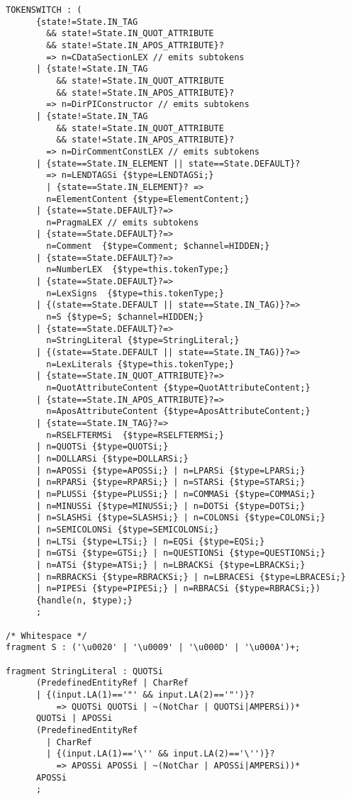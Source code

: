 \begin{verbatim}
TOKENSWITCH : (
      {state!=State.IN_TAG 
        && state!=State.IN_QUOT_ATTRIBUTE 
        && state!=State.IN_APOS_ATTRIBUTE}?
        => n=CDataSectionLEX // emits subtokens
      | {state!=State.IN_TAG 
          && state!=State.IN_QUOT_ATTRIBUTE
          && state!=State.IN_APOS_ATTRIBUTE}?
        => n=DirPIConstructor // emits subtokens
      | {state!=State.IN_TAG 
          && state!=State.IN_QUOT_ATTRIBUTE 
          && state!=State.IN_APOS_ATTRIBUTE}?
        => n=DirCommentConstLEX // emits subtokens
      | {state==State.IN_ELEMENT || state==State.DEFAULT}?
        => n=LENDTAGSi {$type=LENDTAGSi;}
        | {state==State.IN_ELEMENT}? =>
        n=ElementContent {$type=ElementContent;} 
      | {state==State.DEFAULT}?=>
        n=PragmaLEX // emits subtokens
      | {state==State.DEFAULT}?=>
        n=Comment  {$type=Comment; $channel=HIDDEN;}
      | {state==State.DEFAULT}?=> 
        n=NumberLEX  {$type=this.tokenType;}
      | {state==State.DEFAULT}?=>
        n=LexSigns  {$type=this.tokenType;}
      | {(state==State.DEFAULT || state==State.IN_TAG)}?=>
        n=S {$type=S; $channel=HIDDEN;}
      | {state==State.DEFAULT}?=>
        n=StringLiteral {$type=StringLiteral;}
      | {(state==State.DEFAULT || state==State.IN_TAG)}?=>
        n=LexLiterals {$type=this.tokenType;}              
      | {state==State.IN_QUOT_ATTRIBUTE}?=>
        n=QuotAttributeContent {$type=QuotAttributeContent;}
      | {state==State.IN_APOS_ATTRIBUTE}?=>
        n=AposAttributeContent {$type=AposAttributeContent;}
      | {state==State.IN_TAG}?=>
        n=RSELFTERMSi  {$type=RSELFTERMSi;}
      | n=QUOTSi {$type=QUOTSi;}
      | n=DOLLARSi {$type=DOLLARSi;}        
      | n=APOSSi {$type=APOSSi;} | n=LPARSi {$type=LPARSi;}
      | n=RPARSi {$type=RPARSi;} | n=STARSi {$type=STARSi;}
      | n=PLUSSi {$type=PLUSSi;} | n=COMMASi {$type=COMMASi;}
      | n=MINUSSi {$type=MINUSSi;} | n=DOTSi {$type=DOTSi;}
      | n=SLASHSi {$type=SLASHSi;} | n=COLONSi {$type=COLONSi;}
      | n=SEMICOLONSi {$type=SEMICOLONSi;}
      | n=LTSi {$type=LTSi;} | n=EQSi {$type=EQSi;}
      | n=GTSi {$type=GTSi;} | n=QUESTIONSi {$type=QUESTIONSi;}
      | n=ATSi {$type=ATSi;} | n=LBRACKSi {$type=LBRACKSi;}
      | n=RBRACKSi {$type=RBRACKSi;} | n=LBRACESi {$type=LBRACESi;}
      | n=PIPESi {$type=PIPESi;} | n=RBRACSi {$type=RBRACSi;})
      {handle(n, $type);}  
      ;

/* Whitespace */
fragment S : ('\u0020' | '\u0009' | '\u000D' | '\u000A')+;

fragment StringLiteral : QUOTSi
      (PredefinedEntityRef | CharRef 
      | {(input.LA(1)=='"' && input.LA(2)=='"')}?
          => QUOTSi QUOTSi | ~(NotChar | QUOTSi|AMPERSi))* 
      QUOTSi | APOSSi 
      (PredefinedEntityRef 
        | CharRef 
        | {(input.LA(1)=='\'' && input.LA(2)=='\'')}?
          => APOSSi APOSSi | ~(NotChar | APOSSi|AMPERSi))* 
      APOSSi
      ;


\end{verbatim}
